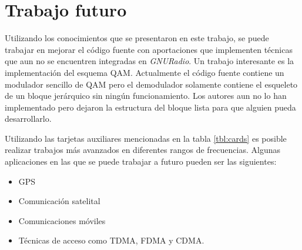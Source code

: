 \section{Trabajo futuro}
Utilizando los conocimientos que se presentaron en este trabajo, se puede trabajar en mejorar el c\'odigo fuente con aportaciones
que implementen t\'ecnicas que aun no se encuentren integradas en \emph{GNURadio}. Un trabajo interesante es la implementaci\'on
del esquema QAM. Actualmente el c\'odigo fuente contiene un modulador sencillo de QAM pero el demodulador solamente contiene el
esqueleto de un bloque jer\'arquico sin ning\'un funcionamiento. Los autores aun no lo han implementado pero dejaron la estructura
del bloque lista para que alguien pueda desarrollarlo.

Utilizando las tarjetas auxiliares mencionadas en la tabla \ref{tbl:cards} es posible realizar trabajos m\'as avanzados en
diferentes rangos de frecuencias. Algunas aplicaciones en las que se puede trabajar a futuro pueden ser las siguientes:
\begin{itemize}
  \item GPS
  \item Comunicaci\'on satelital
  \item Comunicaciones m\'oviles
  \item T\'ecnicas de acceso como TDMA, FDMA y CDMA.
\end{itemize}